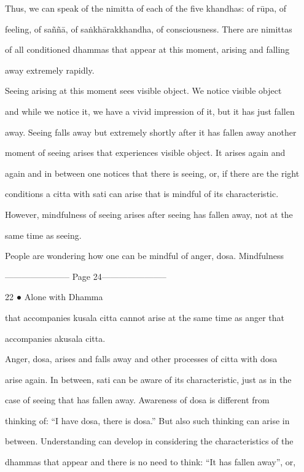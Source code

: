   Thus, we can speak of the nimitta of each of the five khandhas: of rūpa, of  

feeling, of  saññā, of  saṅkhārakkhandha, of  consciousness. There  are nimittas  

of  all  conditioned  dhammas  that  appear  at  this  moment,  arising  and  falling  

away extremely rapidly. 

   Seeing  arising  at  this  moment  sees visible  object. We  notice visible  object  

and while we notice it, we have a vivid impression of it, but it has just  fallen  

away. Seeing falls away but extremely shortly after it has fallen away another  

moment  of  seeing  arises  that  experiences visible   object.  It  arises  again  and  

again and in between one notices that there is seeing, or, if there are the right  

conditions   a   citta   with   sati   can   arise   that   is   mindful   of   its   characteristic.  

However, mindfulness of seeing arises after seeing has fallen away, not at the  

same time as seeing. 

   People are wondering how one can be mindful of anger, dosa. Mindfulness  


----------------------- Page 24-----------------------

22 ● Alone with Dhamma 



that  accompanies  kusala  citta  cannot  arise  at  the  same  time  as  anger  that  

accompanies akusala citta. 

   Anger,   dosa,  arises  and  falls  away  and  other  processes  of  citta with  dosa  

arise  again.  In between,  sati  can be  aware  of  its  characteristic, just   as in the  

case   of   seeing   that   has   fallen   away.   Awareness   of   dosa   is   different   from  

thinking  of:  “I have  dosa, there  is  dosa.” But  also  such thinking  can  arise  in  

between. Understanding can develop in considering the characteristics of the  

dhammas that appear and there is no need to think: “It has fallen away”, or,  

